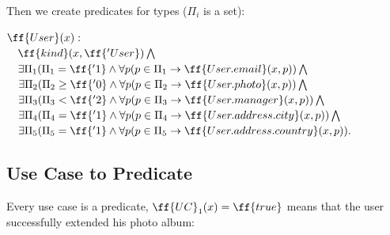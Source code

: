 \documentclass[12pt,oneside,letterpaper]{article}
\begin{document}
Then we create predicates for types ($\Pi_i$ is a set):

\begin{maths}
$\ff{User}(x) :$ \\
$\quad \ff{kind}(x, \ff{'User}) \bigwedge$ \\
$\quad \exists \Pi_1 (\Pi_1 = \ff{'1} \wedge \forall p(p \in \Pi_1 \to \ff{User.email}(x, p)) \bigwedge$ \\
$\quad \exists \Pi_2 (\Pi_2 \geq \ff{'0} \wedge \forall p(p \in \Pi_2 \to \ff{User.photo}(x, p)) \bigwedge$ \\
$\quad \exists \Pi_3 (\Pi_3 < \ff{'2} \wedge \forall p(p \in \Pi_3 \to \ff{User.manager}(x, p)) \bigwedge $ \\
$\quad \exists \Pi_4 (\Pi_4 = \ff{'1} \wedge \forall p(p \in \Pi_4 \to \ff{User.address.city}(x, p)) \bigwedge $ \\
$\quad \exists \Pi_5 (\Pi_5 = \ff{'1} \wedge \forall p(p \in \Pi_5 \to \ff{User.address.country}(x, p)). $ \\
\end{maths}

\subsection{Use Case to Predicate}

Every use case is a predicate, $\ff{UC}_1(x) = \ff{true}$ means that the user
successfully extended his photo album:
\end{document}
